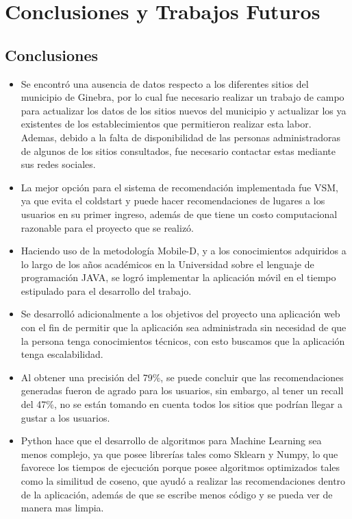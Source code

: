 \documentclass[12pt,letterpaper,openany]{book}
\begin{document}
\chapter{Conclusiones y Trabajos Futuros}\label{cap.conclu_trabajos}
\section{Conclusiones}
\begin{itemize}
    \item Se encontró una ausencia de datos respecto a los diferentes sitios del municipio de
Ginebra, por lo cual fue necesario realizar un trabajo de campo para actualizar los
datos de los sitios nuevos del municipio y actualizar los ya existentes de los establecimientos que permitieron realizar esta labor.\\
Ademas, debido a la falta de disponibilidad de las personas administradoras de algunos de los sitios consultados, fue necesario contactar estas mediante sus redes sociales.
\item La mejor opción para el sistema de recomendación implementada fue VSM, ya que evita el coldstart y puede hacer recomendaciones de lugares a los usuarios en su primer ingreso, además de que tiene un costo computacional razonable para el proyecto que se realizó.
\item Haciendo uso de la metodología Mobile-D, y a los conocimientos adquiridos a lo largo de los años académicos en la Universidad sobre el lenguaje de programación JAVA, se logró implementar la aplicación móvil en el tiempo estipulado para el desarrollo del trabajo.
\item Se desarrolló adicionalmente a los objetivos del proyecto una aplicación web con el fin de permitir que la aplicación sea administrada sin necesidad de que la persona tenga conocimientos técnicos, con esto buscamos que la aplicación tenga escalabilidad.
   \item Al obtener una precisión del 79\%, se puede concluir que las recomendaciones generadas fueron de agrado para los usuarios, sin embargo, al tener un recall del 47\%, no se están tomando en cuenta todos los sitios que podrían llegar a gustar a los usuarios.
   \item Python hace que el desarrollo de algoritmos para Machine Learning sea menos complejo, ya que posee librerías tales como Sklearn y Numpy, lo que favorece los tiempos de ejecución porque posee algoritmos optimizados tales como la similitud de coseno, que ayudó a realizar las recomendaciones dentro de la aplicación, además de que se escribe menos código y se pueda ver de manera mas limpia.
\end{itemize}
\end{document}
